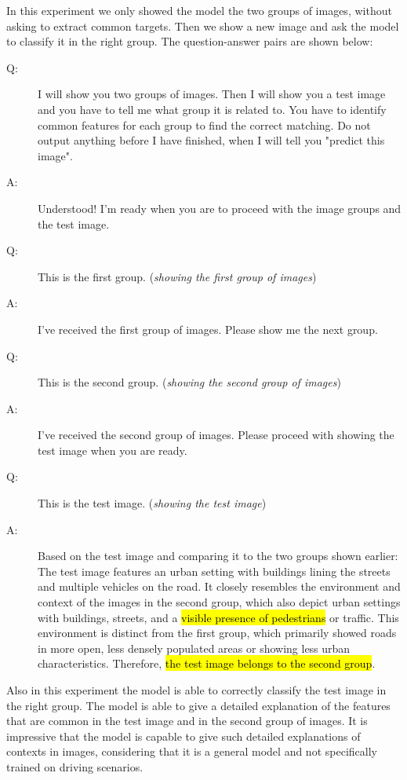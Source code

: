 In this experiment we only showed the model the two groups of images, without 
asking to extract common targets. Then we show a new image and ask the model 
to classify it in the right group. The question-answer pairs are shown below:
{\selectfont
\begin{description}
    \item[Q:] I will show you two groups of images. Then I will show you a test 
    image and you have to tell me what group it is related to. You have to 
    identify common features for each group to find the correct matching. Do not 
    output anything before I have finished, when I will tell you "predict this 
    image".
    \item[A:] Understood! I'm ready when you are to proceed with the image groups 
    and the test image.
    \item[Q:] This is the first group. (\emph{showing the first group of images})
    \item[A:] I've received the first group of images. Please show me the next group.
    \item[Q:] This is the second group. (\emph{showing the second group of images})
    \item[A:] I've received the second group of images. Please proceed with showing 
    the test image when you are ready.
    \item[Q:] This is the test image. (\emph{showing the test image})
    \item[A:] Based on the test image and comparing it to the two groups shown earlier:
    The test image features an urban setting with buildings lining the streets 
    and multiple vehicles on the road. It closely resembles the environment and 
    context of the images in the second group, which also depict urban settings 
    with buildings, streets, and a 
    \hl{visible presence of pedestrians} or traffic. 
    This environment is distinct from the first group, which primarily showed 
    roads in more open, less densely populated areas or showing less urban 
    characteristics. 
    Therefore, \hl{the test image belongs to the second group}.
\end{description}
}
Also in this experiment the model is able to correctly classify the test image 
in the right group. The model is able to give a detailed explanation of the 
features that are common in the test image and in the second group of images.
It is impressive that the model is capable to give such detailed explanations 
of contexts in images, considering that it is a general model and not specifically 
trained on driving scenarios.
